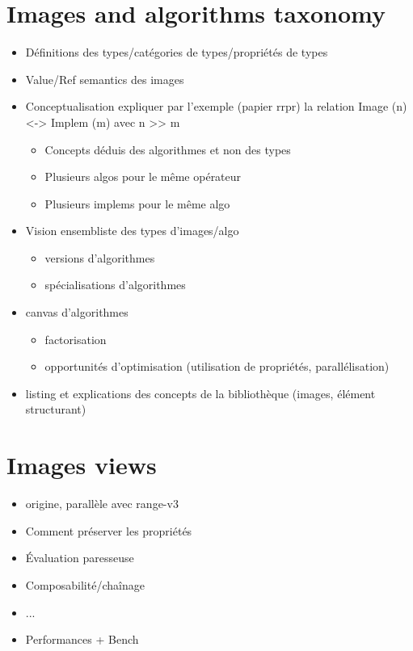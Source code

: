 \documentclass{book}
\begin{document}
\chapter{Images and algorithms taxonomy}

\begin{itemize}
  \item Définitions des types/catégories de types/propriétés de types
  \item Value/Ref semantics des images
  \item Conceptualisation expliquer par l'exemple (papier rrpr) la relation Image (n) <-> Implem (m) avec n >> m
    \begin{itemize}
      \item Concepts déduis des algorithmes et non des types
      \item Plusieurs algos pour le même opérateur
      \item Plusieurs implems pour le même algo
    \end{itemize}
  \item Vision ensembliste des types d'images/algo
    \begin{itemize}
      \item versions d'algorithmes
      \item spécialisations d'algorithmes
    \end{itemize}
  \item canvas d'algorithmes
    \begin{itemize}
      \item factorisation
      \item opportunités d'optimisation (utilisation de propriétés, parallélisation)
    \end{itemize}
  \item listing et explications des concepts de la bibliothèque (images, élément structurant)
\end{itemize}

\cleardoublepage


\chapter{Images views}

\begin{itemize}
  \item origine, parallèle avec range-v3
  \item Comment préserver les propriétés
  \item Évaluation paresseuse
  \item Composabilité/chaînage
  \item ...
  \item Performances + Bench
\end{itemize}
\end{document}
